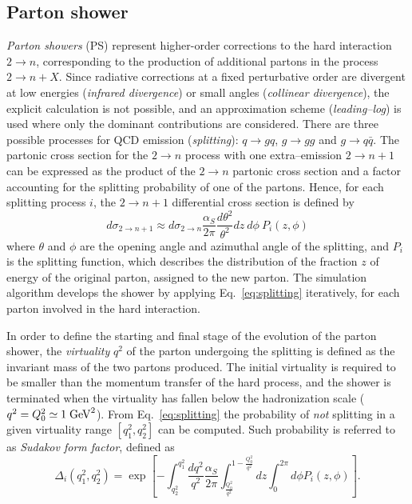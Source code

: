\subsection{Parton shower}
\label{sec:partonshower}

{\it Parton showers} (PS) represent higher-order corrections to the hard
interaction $2\to n$, corresponding to the production of additional
partons in the process $2\to n+X$.
Since radiative corrections at a fixed perturbative order are
divergent at low energies ({\it infrared divergence}) or small angles
({\it collinear divergence}), the explicit calculation is not possible,
and an approximation scheme ({\it leading--log}) is used where only
the dominant contributions are considered.
There are three possible processes for QCD emission ({\it splitting}): 
$q\to gq$, $g\to gg$ and $g\to q\bar{q}$.
The partonic cross section for the $2\to n$ process with one
extra--emission $2\to n+1$ can be expressed as the product of the
$2\to n$ partonic cross section and a factor accounting for the
splitting probability of one of the partons. 
Hence, for each splitting process $i$, the $2\to n+1$ differential
cross section is defined by
\begin{equation}
  d\sigma_{2\to n+1}\approx{} d\sigma_{2\to n}
  \frac{\alpha_S}{2\pi}\frac{d\theta^2}{\theta^2} dz~d\phi~P_i(z,\phi) 
 \label{eq:splitting}
\end{equation}
where $\theta$ and $\phi$ are the opening angle and azimuthal angle of
the splitting, and $P_i$ is the splitting function, which describes
the distribution of the fraction $z$ of energy of the original parton,
assigned to the new parton.
The simulation algorithm develops the shower by applying
Eq.~\ref{eq:splitting} iteratively, for each parton involved in the
hard interaction.

In order to define the starting and final stage of the evolution of
the parton shower, the {\it virtuality} $q^2$ of the parton undergoing
the splitting is defined as the invariant mass of the two partons
produced. The initial virtuality is required to be smaller than the
momentum transfer of the hard process, and the shower is terminated
when the virtuality has fallen below the hadronization scale
($q^2=Q_0^2\simeq1\; \mathrm{GeV}^2$).
From Eq.~\ref{eq:splitting} the probability of {\it not} splitting in
a given virtuality range $[q_1^2,q_2^2]$ can be computed. Such
probability is referred to as {\it Sudakov form factor}, defined as
\begin{equation}
  \label{eq:sudakov} 
  \Delta_i (q_1^2, q_2^2) = \exp \left[ - \int_{q_2^2}^{q_1^2}
    \frac{dq^2}{q^2} \frac{\alpha_S}{2\pi}
    \int_{\frac{Q_0^2}{q^2}}^{1-\frac{Q_0^2}{q^2}} dz \int_0^{2\pi} d\phi{} P_{i} (z,\phi) \right].
\end{equation}

